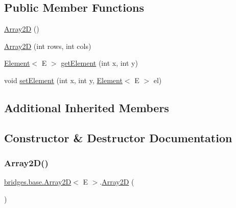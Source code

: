 \subsection*{Public Member Functions}
\begin{DoxyCompactItemize}
\item 
\hyperlink{classbridges_1_1base_1_1_array2_d_a48259310b06b5e143cd3bbdfe480f4a0}{Array2D} ()
\item 
\hyperlink{classbridges_1_1base_1_1_array2_d_a51fab452b4705ce593199b90cee2a103}{Array2D} (int rows, int cols)
\item 
\hyperlink{classbridges_1_1base_1_1_element}{Element}$<$ E $>$ \hyperlink{classbridges_1_1base_1_1_array2_d_a65797bf0a9c176ad18fba85cdf6470bd}{get\+Element} (int x, int y)
\item 
void \hyperlink{classbridges_1_1base_1_1_array2_d_a093f0b451def8c5229fe1bed22658fb1}{set\+Element} (int x, int y, \hyperlink{classbridges_1_1base_1_1_element}{Element}$<$ E $>$ el)
\end{DoxyCompactItemize}
\subsection*{Additional Inherited Members}


\subsection{Constructor \& Destructor Documentation}
\mbox{\label{classbridges_1_1base_1_1_array2_d_a48259310b06b5e143cd3bbdfe480f4a0}} 
\subsubsection{\texorpdfstring{Array2\+D()}{Array2D()}\hspace{0.1cm}{\footnotesize\ttfamily [1/2]}}
{\footnotesize\ttfamily \hyperlink{classbridges_1_1base_1_1_array2_d}{bridges.\+base.\+Array2D}$<$ E $>$.\hyperlink{classbridges_1_1base_1_1_array2_d}{Array2D} (\begin{DoxyParamCaption}{ }\end{DoxyParamCaption})}

\mbox{\label{classbridges_1_1base_1_1_array2_d_a51fab452b4705ce593199b90cee2a103}} 
